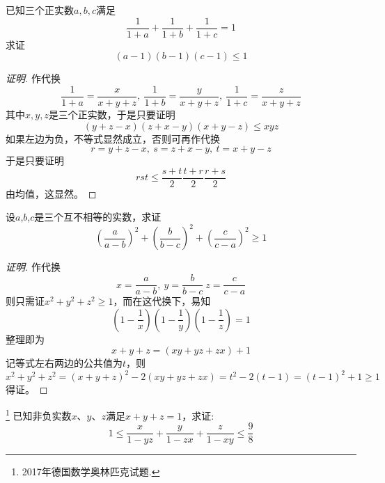 \begin{exercise}
  已知三个正实数$a,b,c$满足
  \begin{equation*}
    \frac{1}{1+a} + \frac{1}{1+b} + \frac{1}{1+c} = 1
  \end{equation*}
  求证
  \begin{equation*}
    (a-1)(b-1)(c-1) \leqslant 1
  \end{equation*}
\end{exercise}

\begin{proof}[证明]
  作代换
  \begin{equation*}
    \frac{1}{1+a} = \frac{x}{x+y+z}, \  \frac{1}{1+b} = \frac{y}{x+y+z}, \  \frac{1}{1+c} = \frac{z}{x+y+z}
  \end{equation*}
  其中$x,y,z$是三个正实数，于是只要证明
  \begin{equation*}
    (y+z-x)(z+x-y)(x+y-z) \leqslant xyz
  \end{equation*}
  如果左边为负，不等式显然成立，否则可再作代换
  \begin{equation*}
    r = y+z-x, \  s = z+x-y, \  t = x+y-z
  \end{equation*}
  于是只要证明
  \begin{equation*}
    rst \leqslant \frac{s+t}{2} \frac{t+r}{2} \frac{r+s}{2}
  \end{equation*}
  由均值，这显然。
\end{proof}

\begin{exercise}
  设$a$,$b$,$c$是三个互不相等的实数，求证
  \[ \left( \frac{a}{a-b} \right)^2 + \left( \frac{b}{b-c} \right)^2 + \left( \frac{c}{c-a} \right)^2 \geqslant 1 \]
\end{exercise}

\exerciseFrom[2008年IMO试题变形, \url{http://kuing.orzweb.net/viewthread.php?tid=4579}]

\exerciseSolvedDate[2017-05-05]

\begin{proof}[证明]
  作代换
  \[ x=\frac{a}{a-b}, \  y=\frac{b}{b-c} \  z=\frac{c}{c-a} \]
  则只需证$x^2+y^2+z^2 \geqslant 1$，而在这代换下，易知
  \[ \left( 1-\frac{1}{x} \right) \left( 1-\frac{1}{y} \right) \left( 1-\frac{1}{z} \right) = 1 \]
  整理即为
  \[ x+y+z = (xy+yz+zx)+1 \]
  记等式左右两边的公共值为$t$，则
    \[ x^2+y^2+z^2 = (x+y+z)^2-2(xy+yz+zx) = t^2-2(t-1)=(t-1)^2+1 \geqslant 1 \]
  得证。
\end{proof}

\begin{exercise}\footnote{2017年德国数学奥林匹克试题.}
  已知非负实数$x$、$y$、$z$满足$x+y+z=1$，求证:
  \[ 1 \leqslant \frac{x}{1-yz}+\frac{y}{1-zx}+\frac{z}{1-xy} \leqslant \frac{9}{8} \]
\end{exercise}

